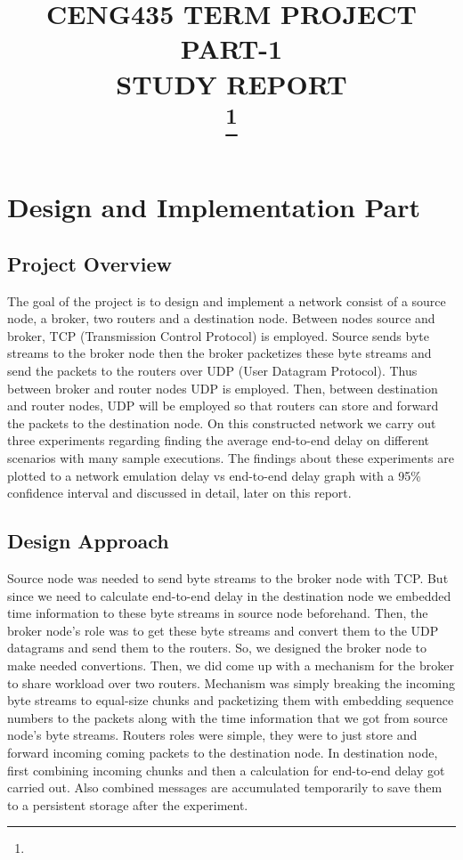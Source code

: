 \documentclass[conference]{IEEEtran}
\begin{document}
\title{CENG435 TERM PROJECT PART-1 \\ STUDY REPORT \\
{\footnotesize}
\thanks{}
}

\author{
\and
{}
}

\maketitle

\section{Design and Implementation Part}
\subsection{Project Overview}
The goal of the project is to design and implement a network consist of a source node, a broker, two routers and a destination node. Between nodes source and broker, TCP (Transmission Control Protocol) is employed. Source sends byte streams to the broker node then the broker packetizes these byte streams and send the packets to the routers over UDP (User Datagram Protocol). Thus between broker and router nodes UDP is employed. Then, between destination and router nodes, UDP will be employed so that routers can store and forward the packets to the destination node. On this constructed network we carry out three experiments regarding finding the average end-to-end delay on different scenarios with many sample executions. The findings about these experiments are plotted to a network emulation delay vs end-to-end delay graph with a 95\% confidence interval and discussed in detail, later on this report.

\subsection{Design Approach}
Source node was needed to send byte streams to the broker node with TCP. But since we need to calculate end-to-end delay in the destination node we embedded time information to these byte streams in source node beforehand. Then, the broker node's role was to get these byte streams and convert them to the UDP datagrams and send them to the routers. So, we designed the broker node to make needed convertions. Then, we did come up with a mechanism for the broker to share workload over two routers. Mechanism was simply breaking the incoming byte streams to equal-size chunks and packetizing them with embedding sequence numbers to the packets along with the time information that we got from source node's byte streams. Routers roles were simple, they were to just store and forward incoming coming packets to the destination node. In destination node, first combining incoming chunks and then a calculation for end-to-end delay got carried out. Also combined messages are accumulated temporarily to save them to a persistent storage after the experiment.
\end{document}
